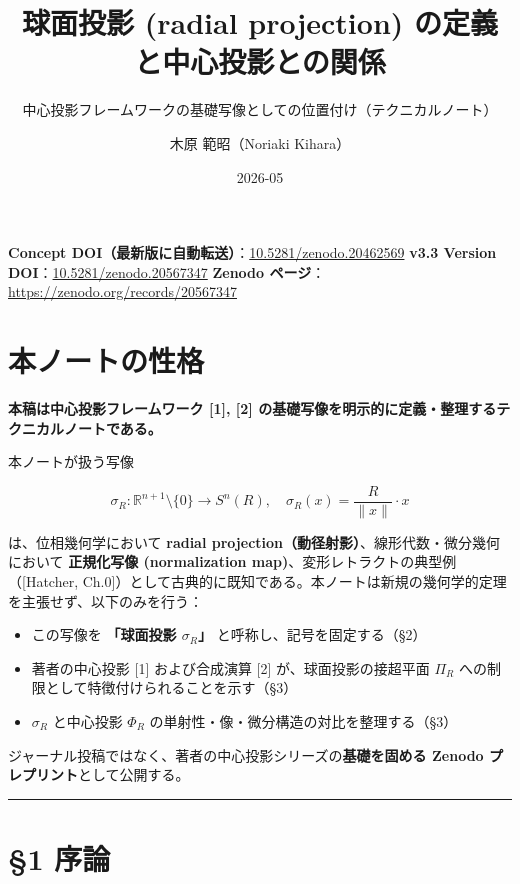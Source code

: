 \documentclass[
]{ltjsarticle}
\title{球面投影 (radial projection) の定義と中心投影との関係}
\subtitle{中心投影フレームワークの基礎写像としての位置付け（テクニカルノート）}
\author{木原 範昭（Noriaki Kihara）}
\date{2026-05}
\providecommand{\tightlist}{%
  \setlength{\itemsep}{0pt}\setlength{\parskip}{0pt}}
\begin{document}
\maketitle

\textbf{Concept
DOI（最新版に自動転送）}：\href{https://doi.org/10.5281/zenodo.20462569}{10.5281/zenodo.20462569}
\textbf{v3.3 Version
DOI}：\href{https://doi.org/10.5281/zenodo.20567347}{10.5281/zenodo.20567347}
\textbf{Zenodo ページ}：\url{https://zenodo.org/records/20567347}

\section{本ノートの性格}\label{ux672cux30ceux30fcux30c8ux306eux6027ux683c}

\textbf{本稿は中心投影フレームワーク {[}1{]}, {[}2{]}
の基礎写像を明示的に定義・整理するテクニカルノートである。}

本ノートが扱う写像

\[\sigma_R: \mathbb{R}^{n+1} \setminus \{0\} \to S^n(R), \quad \sigma_R(x) = \frac{R}{\|x\|} \cdot x\]

は、位相幾何学において \textbf{radial
projection（動径射影）}、線形代数・微分幾何において \textbf{正規化写像
(normalization map)}、変形レトラクトの典型例（{[}Hatcher,
Ch.0{]}）として古典的に既知である。本ノートは新規の幾何学的定理を主張せず、以下のみを行う：

\begin{itemize}
\tightlist
\item
  この写像を \textbf{「球面投影 \(\sigma_R\)」}
  と呼称し、記号を固定する（§2）
\item
  著者の中心投影 {[}1{]} および合成演算 {[}2{]} が、球面投影の接超平面
  \(\Pi_R\) への制限として特徴付けられることを示す（§3）
\item
  \(\sigma_R\) と中心投影 \(\Phi_R\)
  の単射性・像・微分構造の対比を整理する（§3）
\end{itemize}

ジャーナル投稿ではなく、著者の中心投影シリーズの\textbf{基礎を固める
Zenodo プレプリント}として公開する。

\begin{center}\rule{0.5\linewidth}{0.5pt}\end{center}

\section{§1 序論}\label{ux5e8fux8ad6}
\end{document}
